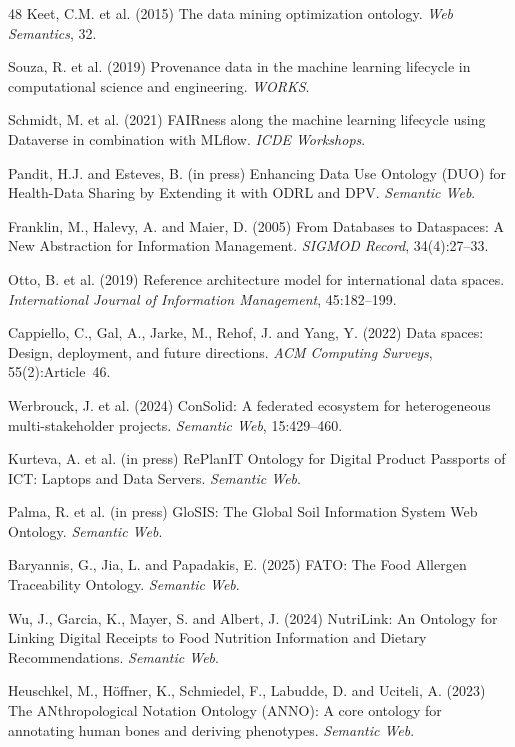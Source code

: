 \documentclass[Afour,sagev,times]{sagej}
\begin{document}
\begin{thebibliography}{48}
 Keet, C.M. et al. (2015) The data mining optimization ontology. \emph{Web Semantics}, 32.

 Souza, R. et al. (2019) Provenance data in the machine learning lifecycle in computational science and engineering. \emph{WORKS}.

 Schmidt, M. et al. (2021) FAIRness along the machine learning lifecycle using Dataverse in combination with MLflow. \emph{ICDE Workshops}.

 Pandit, H.J. and Esteves, B. (in press) Enhancing Data Use Ontology (DUO) for Health-Data Sharing by Extending it with ODRL and DPV. \emph{Semantic Web}.

 Franklin, M., Halevy, A. and Maier, D. (2005) From Databases to Dataspaces: A New Abstraction for Information Management. \emph{SIGMOD Record}, 34(4):27--33.

 Otto, B. et al. (2019) Reference architecture model for international data spaces. \emph{International Journal of Information Management}, 45:182--199.

 Cappiello, C., Gal, A., Jarke, M., Rehof, J. and Yang, Y. (2022) Data spaces: Design, deployment, and future directions. \emph{ACM Computing Surveys}, 55(2):Article~46.

 Werbrouck, J. et al. (2024) ConSolid: A federated ecosystem for heterogeneous multi-stakeholder projects. \emph{Semantic Web}, 15:429--460.

 Kurteva, A. et al. (in press) RePlanIT Ontology for Digital Product Passports of ICT: Laptops and Data Servers. \emph{Semantic Web}.

 Palma, R. et al. (in press) GloSIS: The Global Soil Information System Web Ontology. \emph{Semantic Web}.

 Baryannis, G., Jia, L. and Papadakis, E. (2025) FATO: The Food Allergen Traceability Ontology. \emph{Semantic Web}.

 Wu, J., Garcia, K., Mayer, S. and Albert, J. (2024) NutriLink: An Ontology for Linking Digital Receipts to Food Nutrition Information and Dietary Recommendations. \emph{Semantic Web}.

 Heuschkel, M., H\"offner, K., Schmiedel, F., Labudde, D. and Uciteli, A. (2023) The ANthropological Notation Ontology (ANNO): A core ontology for annotating human bones and deriving phenotypes. \emph{Semantic Web}.


\end{thebibliography}
\end{document}
